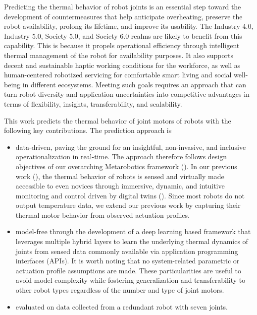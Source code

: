 \documentclass{ifacconf}
\begin{document}
Predicting the thermal behavior of robot joints is an essential step toward the development of countermeasures that help anticipate overheating, preserve the robot availability,  prolong its lifetime, and improve its usability. The Industry 4.0, Industry 5.0,  Society 5.0, and Society 6.0 realms are likely to benefit from this capability. This is because it propels operational efficiency through intelligent thermal management of the robot for availability purposes. It also supports decent and sustainable haptic working conditions for the workforce, as well as human-centered robotized servicing for comfortable smart living and social well-being in different ecosystems. Meeting such goals requires an approach that can turn robot diversity and application uncertainties into competitive advantages in terms of flexibility, insights, transferability, and scalability.

This work predicts  the thermal behavior of joint motors of robots with the following key contributions. The prediction approach is
\begin{itemize}
	\item data-driven, paving the ground for an  insightful, non-invasive, and inclusive operationalization in real-time. The approach therefore follows  design objectives of our overarching Metarobotics framework (\cite{kaigom2023metarobotics}). In our previous work (\cite{abt}), the thermal behavior of  robots is sensed and virtually made accessible to even novices through  immersive, dynamic, and intuitive monitoring and control driven by digital twins (\cite{kaigom2020value}). Since most robots do not output temperature data, we extend our previous work by capturing their thermal motor behavior from observed  actuation profiles.
	\item model-free through the development of a deep learning based framework that leverages multiple hybrid layers to learn the underlying thermal dynamics of joints from sensed data commonly available via  application programming interfaces (APIs). It is worth noting that no system-related parametric or actuation profile assumptions are made. These particularities are useful to avoid model complexity while fostering generalization and transferability to other robot types regardless of the number and type of joint motors.
	\item evaluated on data collected from a redundant robot with seven joints.
\end{itemize}
\end{document}
